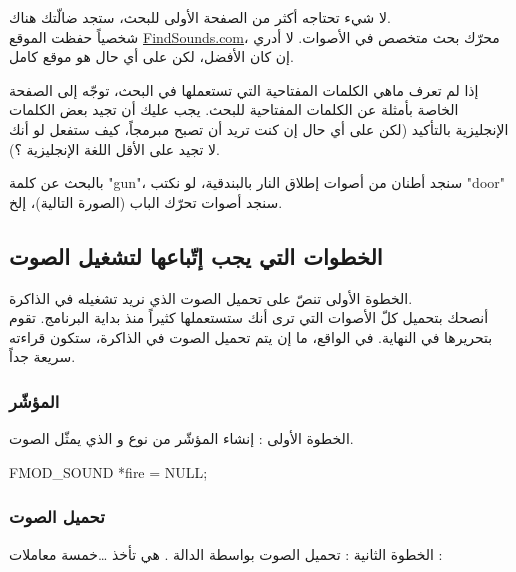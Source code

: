 لا شيء تحتاجه أكثر من الصفحة الأولى للبحث، ستجد ضالّتك هناك.\\
شخصياً حفظت الموقع 
\href{http://www.findsounds.com/}{\textenglish{FindSounds.com}}،
محرّك بحث متخصص في الأصوات. لا أدري إن كان الأفضل، لكن على أي حال هو موقع كامل.

\begin{information}
إذا لم تعرف  ماهي الكلمات المفتاحية التي تستعملها في البحث، توجّه إلى الصفحة الخاصة بأمثلة عن الكلمات المفتاحية للبحث.
يجب عليك أن تجيد بعض الكلمات الإنجليزية بالتأكيد (لكن على أي حال إن كنت تريد أن تصبح مبرمجاً، كيف ستفعل لو أنك لا تجيد على الأقل اللغة الإنجليزية ؟).
\end{information}

بالبحث عن كلمة 
"\textenglish{gun}"،
سنجد أطنان من أصوات إطلاق النار بالبندقية، لو نكتب
"\textenglish{door}"
سنجد أصوات تحرّك الباب (الصورة التالية)، إلخ.


\subsection{الخطوات التي يجب إتّباعها لتشغيل الصوت}

 الخطوة الأولى تنصّ على تحميل الصوت الذي نريد تشغيله في الذاكرة.\\
أنصحك بتحميل كلّ الأصوات التي ترى أنك ستستعملها كثيراً منذ بداية البرنامج. تقوم بتحريرها في النهاية. في الواقع، ما إن يتم تحميل الصوت في الذاكرة، ستكون قراءته سريعة جداً.

\subsubsection{المؤشّر}

الخطوة الأولى : إنشاء المؤشّر من نوع
و الذي يمثّل الصوت.

\begin{Csource}
FMOD_SOUND *fire = NULL;
\end{Csource}

\subsubsection{تحميل الصوت}

الخطوة الثانية : تحميل الصوت بواسطة الدالة
.
هي تأخذ \dots خمسة معاملات :

